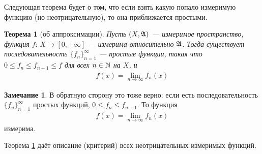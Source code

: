 \documentclass[a4paper,14pt]{extarticle}
\newcounter{theoremCnt}
\theoremstyle{definition}
\theoremstyle{plain}
\newtheorem{thm}[theoremCnt]{Теорема}
\theoremstyle{plain}
\theoremstyle{plain}
\theoremstyle{plain}
\theoremstyle{definition}
\theoremstyle{definition}
\newtheorem{remrk}[theoremCnt]{Замечание}
\theoremstyle{definition}
\theoremstyle{definition}
\theoremstyle{definition}
\theoremstyle{definition}
\theoremstyle{plain}
\theoremstyle{plain}
\theoremstyle{plain}
\theoremstyle{plain}
\theoremstyle{definition}
\theoremstyle{definition}
\theoremstyle{definition}
\theoremstyle{definition}
\theoremstyle{definition}
\newcommand{\N}{\ensuremath \mathbb{N}}
\newcommand{\A}{\ensuremath \mathfrak{A}}
\begin{document}
Следующая теорема будет о том, что если взять какую попало измеримую функцию (но неотрицательную), то она приближается простыми.


\begin{thm}[об аппроксимации]
 \label{theorem:approximation}
 Пусть $(X, \A)$ --- измеримое пространство, функция $f \colon\, X \to [0, +\infty]  $ --- измерима относительно $\A$. Тогда существует последовательность $\{f_{n}\}_{n=1}^{\infty} $ --- простые функции, такая что $0 \leqslant f_n \leqslant f_{n+1} \leqslant f$ для всех $n \in \N$ на $X$, и \begin{align*}
  f(x) = \lim\limits_{n \to \infty} f_n(x)
 \end{align*} 
\end{thm}
\begin{remrk}
 В обратную сторону это тоже верно: если есть последовательность $\{f_{n}\}_{n=1}^{\infty} $ простых функций, $0 \leqslant f_n \leqslant f_{n+1}$. То функция \begin{align*}
  f(x) = \lim\limits_{n \to \infty} f_n(x)
 \end{align*} измерима.

 Теорема \ref{theorem:approximation} даёт описание (критерий) всех неотрицательных измеримых функций.
\end{remrk}
\end{document}
